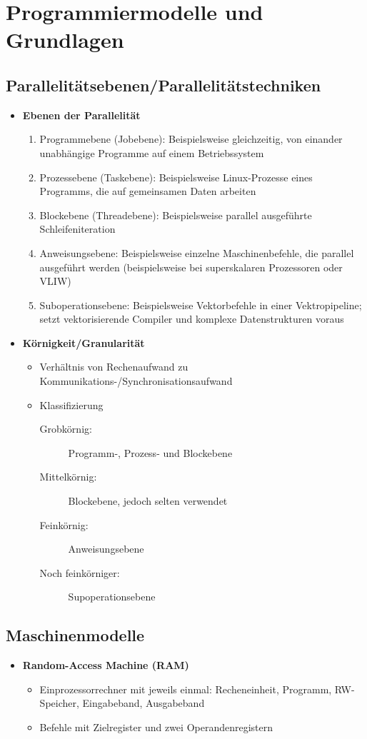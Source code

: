 \section{Programmiermodelle und Grundlagen}

\subsection{Parallelitätsebenen/Parallelitätstechniken}
\begin{itemize}
	\item \textbf{Ebenen der Parallelität}
	\begin{enumerate}
		\item Programmebene (Jobebene): Beispielsweise gleichzeitig, von einander unabhängige Programme auf einem Betriebssystem
		\item Prozessebene (Taskebene): Beispielsweise Linux-Prozesse eines Programms, die auf gemeinsamen Daten arbeiten
		\item Blockebene (Threadebene): Beispielsweise parallel ausgeführte Schleifeniteration
		\item Anweisungsebene: Beispielsweise einzelne Maschinenbefehle, die parallel ausgeführt werden (beispielsweise bei superskalaren Prozessoren oder VLIW) 
		\item Suboperationsebene: Beispielsweise Vektorbefehle in einer Vektropipeline; setzt vektorisierende Compiler und komplexe Datenstrukturen voraus
	\end{enumerate}
	\item \textbf{Körnigkeit/Granularität}
	\begin{itemize}
		\item Verhältnis von Rechenaufwand zu Kommunikations-/Synchronisationsaufwand
		\item Klassifizierung
		\begin{description}
			\item[Grobkörnig:] Programm-, Prozess- und Blockebene
			\item[Mittelkörnig:] Blockebene, jedoch selten verwendet
			\item[Feinkörnig:] Anweisungsebene
			\item[Noch feinkörniger:] Supoperationsebene
		\end{description}
	\end{itemize}
\end{itemize}


\subsection{Maschinenmodelle}
\begin{itemize}
	\item \textbf{Random-Access Machine (RAM)}
	\begin{itemize}
		\item Einprozessorrechner mit jeweils einmal: Recheneinheit, Programm, RW-Speicher, Eingabeband, Ausgabeband
		\item Befehle mit Zielregister und zwei Operandenregistern
	\end{itemize}
\end{itemize}

